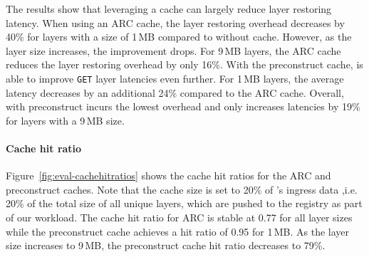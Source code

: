 %
The results show that
leveraging a cache can largely reduce layer restoring latency.
%
When using an ARC cache, the layer restoring overhead decreases by 40\% for layers with
a size of 1\,MB compared to \sysname without cache.
%
However, as the layer size increases,  the improvement drops.
%
For 9\,MB layers, the ARC cache reduces the layer restoring overhead by only 16\%.
%
%
With the preconstruct cache, \sysname is able to improve \texttt{GET} layer latencies even further.
%
For 1\,MB layers, the average latency decreases by an additional 24\% compared to the ARC cache.
%
Overall, \sysname with preconstruct incurs the lowest overhead and only increases latencies by
19\% for layers with a 9\,MB size. 

\paragraph{Cache hit ratio}
%
Figure~\ref{fig:eval-cachehitratios} shows the cache hit ratios for the ARC and
preconstruct caches.
%
Note that the cache size is set to 20\% of \dal{}'s ingress data ,i.e. 20\% of the total size of
all unique layers, which are pushed to the registry as part of our workload.
%
%
%
The cache hit ratio for ARC is stable at 0.77 for all layer sizes while
the preconstruct cache achieves a hit ratio of 0.95 for 1\,MB.
%
As the layer size increases to 9\,MB, the preconstruct cache hit ratio decreases to 79\%.

